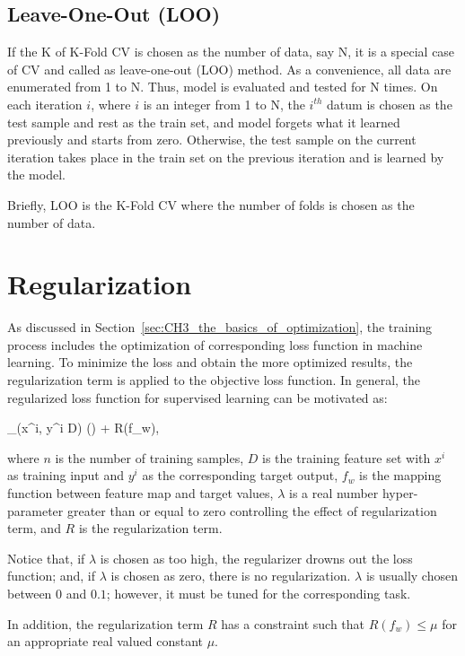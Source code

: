 \subsection{Leave-One-Out (LOO)}

If the K of K-Fold CV is chosen as the number of data, say N, it is a special case of CV and called as leave-one-out (LOO) method. As a convenience, all data are enumerated from 1 to N. Thus, model is evaluated and tested for N times. On each iteration $i$, where $i$ is an integer from 1 to N, the $i^{th}$ datum is chosen as the test sample and rest as the train set, and model forgets what it learned previously and starts from zero. Otherwise, the test sample on the current iteration takes place in the train set on the previous iteration and is learned by the model.

Briefly, LOO is the K-Fold CV where the number of folds is chosen as the number of data.

\section{Regularization}
\label{sec:CH5_regularization}

As discussed in Section~\ref{sec:CH3_the_basics_of_optimization}, the training process includes the optimization of corresponding loss function in machine learning. To minimize the loss and obtain the more optimized results, the regularization term is applied to the objective loss function. In general, the regularized loss function for supervised learning can be motivated as:

\be
\label{eq:general_regularized_loss}
\sum_{(x^{i}, y^{i} \in D)} \Big(\Big) + \lambda R(f_{w}), 
\ee

where $n$ is the number of training samples, $D$ is the training feature set with $x^{i}$ as training input and $y^{i}$ as the corresponding target output, $f_{w}$ is the mapping function between feature map and target values, $\lambda$ is a real number hyper-parameter greater than or equal to zero controlling the effect of regularization term, and $R$ is the regularization term. 

Notice that, if $\lambda$ is chosen as too high, the regularizer drowns out the loss function; and, if $\lambda$ is chosen as zero, there is no regularization. $\lambda$ is usually chosen between $0$ and $0.1$; however, it must be tuned for the corresponding task.

In addition, the regularization term $R$ has a constraint such that $R(f_{w}) \leq \mu$ for an appropriate real valued constant $\mu$.

